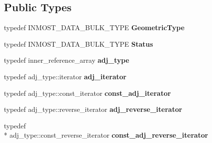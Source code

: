 \subsection*{Public Types}
\begin{DoxyCompactItemize}
\item 
\hypertarget{classINMOST_1_1Element_a67ac235d4dcb5a949fa9150d5b82ebd8}{typedef I\-N\-M\-O\-S\-T\-\_\-\-D\-A\-T\-A\-\_\-\-B\-U\-L\-K\-\_\-\-T\-Y\-P\-E {\bfseries Geometric\-Type}}\label{classINMOST_1_1Element_a67ac235d4dcb5a949fa9150d5b82ebd8}

\item 
\hypertarget{classINMOST_1_1Element_ac872af2720bbc9dcf55ec63eb09c639b}{typedef I\-N\-M\-O\-S\-T\-\_\-\-D\-A\-T\-A\-\_\-\-B\-U\-L\-K\-\_\-\-T\-Y\-P\-E {\bfseries Status}}\label{classINMOST_1_1Element_ac872af2720bbc9dcf55ec63eb09c639b}

\item 
\hypertarget{classINMOST_1_1Element_aff536a514195ba59e540455bdf40fd14}{typedef inner\-\_\-reference\-\_\-array {\bfseries adj\-\_\-type}}\label{classINMOST_1_1Element_aff536a514195ba59e540455bdf40fd14}

\item 
\hypertarget{classINMOST_1_1Element_ae98d7bc1b7117dbf5ec2509138cfb610}{typedef adj\-\_\-type\-::iterator {\bfseries adj\-\_\-iterator}}\label{classINMOST_1_1Element_ae98d7bc1b7117dbf5ec2509138cfb610}

\item 
\hypertarget{classINMOST_1_1Element_a493993dcd759b29914bacee2343c099e}{typedef adj\-\_\-type\-::const\-\_\-iterator {\bfseries const\-\_\-adj\-\_\-iterator}}\label{classINMOST_1_1Element_a493993dcd759b29914bacee2343c099e}

\item 
\hypertarget{classINMOST_1_1Element_a3e3c89f0d9aa578dedb07060046da74e}{typedef adj\-\_\-type\-::reverse\-\_\-iterator {\bfseries adj\-\_\-reverse\-\_\-iterator}}\label{classINMOST_1_1Element_a3e3c89f0d9aa578dedb07060046da74e}

\item 
\hypertarget{classINMOST_1_1Element_a2212e3f149d9dab8ae5e918b9f6942ad}{typedef \\*
adj\-\_\-type\-::const\-\_\-reverse\-\_\-iterator {\bfseries const\-\_\-adj\-\_\-reverse\-\_\-iterator}}\label{classINMOST_1_1Element_a2212e3f149d9dab8ae5e918b9f6942ad}

\end{DoxyCompactItemize}
